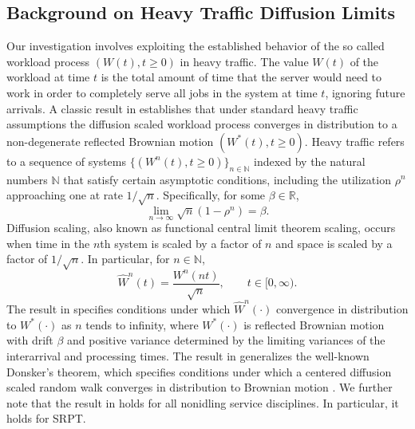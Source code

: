 \documentclass[12pt]{article}
\theoremstyle{plain}
\theoremstyle{definition}
\theoremstyle{remark}
\newcommand{\N}{\mathbb{N}}
\newcommand{\R}{\mathbb{R}}
\newcommand{\What}{\widehat{W}^{n}(t)}
\newcommand{\Wfhat}{\widehat{W}^{n}(\cdot)}
\begin{document}
\subsection{Background on Heavy Traffic Diffusion Limits}
Our investigation involves exploiting the established behavior of the so called workload process $(W(t),t\ge 0)$ in
heavy traffic.  The value $W(t)$ of the workload at time $t$ is the total amount of time that the server would need to work in order to completely serve all jobs in the system at time $t$, ignoring future arrivals.  A classic result in \cite{igl70} establishes that under standard heavy traffic assumptions the diffusion scaled workload process converges in distribution to a non-degenerate reflected Brownian motion $(W^*(t),t\ge 0)$.  Heavy traffic refers to a sequence of systems $\{(W^n(t),t\ge 0)\}_{n\in\N}$ indexed by the natural numbers ${\mathbb N}$ that satisfy certain asymptotic conditions, including the utilization $\rho^n$ approaching one at rate $1/\sqrt{n}$.  Specifically,  for some $\beta\in\R$,
$$
\lim_{n\to\infty} \sqrt{n}\left( 1- \rho^n\right) =\beta.
$$
Diffusion scaling, also known as functional central limit theorem scaling, occurs when time in the $n$th system is scaled by a factor of $n$ and space is scaled by a factor of $1/\sqrt{n}$.  In particular, for $n\in{\mathbb N}$,
\begin{equation}\label{eq:What}
\What=\frac{W^n(nt)}{\sqrt{n}},\qquad t\in[0,\infty).
\end{equation}
The result in \cite{igl70} specifies conditions under which $\Wfhat$ convergence in distribution to $W^*(\cdot)$
as $n$ tends to infinity, where $W^*(\cdot)$ is reflected Brownian motion with drift $\beta$ and positive variance determined by the limiting variances of the interarrival and processing times.
The result in \cite{igl70} generalizes the well-known Donsker's theorem, which specifies conditions under which a centered diffusion
scaled random walk converges in distribution to Brownian motion \cite[Theorem 6.6]{dur95}.  We further note that the
result in \cite{igl70} holds for all nonidling service disciplines. In particular, it holds for SRPT.
\end{document}
